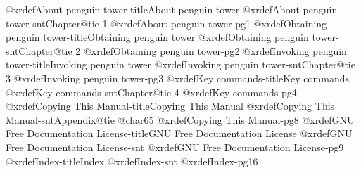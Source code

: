 @xrdef{About penguin tower-title}{About penguin tower}
@xrdef{About penguin tower-snt}{Chapter@tie 1}
@xrdef{About penguin tower-pg}{1}
@xrdef{Obtaining penguin tower-title}{Obtaining penguin tower}
@xrdef{Obtaining penguin tower-snt}{Chapter@tie 2}
@xrdef{Obtaining penguin tower-pg}{2}
@xrdef{Invoking penguin tower-title}{Invoking penguin tower}
@xrdef{Invoking penguin tower-snt}{Chapter@tie 3}
@xrdef{Invoking penguin tower-pg}{3}
@xrdef{Key commands-title}{Key commands}
@xrdef{Key commands-snt}{Chapter@tie 4}
@xrdef{Key commands-pg}{4}
@xrdef{Copying This Manual-title}{Copying This Manual}
@xrdef{Copying This Manual-snt}{Appendix@tie @char65{}}
@xrdef{Copying This Manual-pg}{8}
@xrdef{GNU Free Documentation License-title}{GNU Free Documentation License}
@xrdef{GNU Free Documentation License-snt}{}
@xrdef{GNU Free Documentation License-pg}{9}
@xrdef{Index-title}{Index}
@xrdef{Index-snt}{}
@xrdef{Index-pg}{16}
